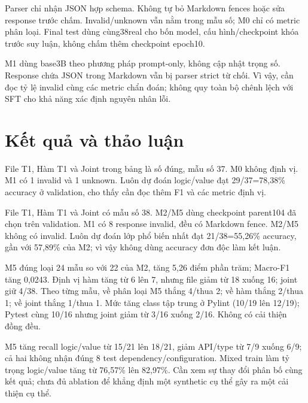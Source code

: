 \documentclass[12pt,a4paper]{article}
\begin{document}
Parser chỉ nhận JSON hợp schema. Không tự bỏ Markdown fences hoặc sửa response trước chấm. Invalid/unknown vẫn nằm trong mẫu số; M0 chỉ có metric phân loại. Final test dùng cùng38real cho bốn model, cấu hình/checkpoint khóa trước suy luận, không chấm thêm checkpoint epoch10.

M1 dùng base3B theo phương pháp prompt-only, không cập nhật trọng số. Response chứa JSON trong Markdown vẫn bị parser strict từ chối. Vì vậy, cần đọc tỷ lệ invalid cùng các metric chẩn đoán; không quy toàn bộ chênh lệch với SFT cho khả năng xác định nguyên nhân lỗi.

\nextpage
\section{Kết quả và thảo luận}
\begin{center}\small\end{center}
File T1, Hàm T1 và Joint trong bảng là số đúng, mẫu số 37. M0 không định vị. M1 có 1 invalid và 1 unknown. Luôn dự đoán logic/value đạt 29/37=78,38\% accuracy ở validation, cho thấy cần đọc thêm F1 và các metric định vị.

\begin{center}\small\end{center}
File T1, Hàm T1 và Joint có mẫu số 38. M2/M5 dùng checkpoint parent104 đã chọn trên validation. M1 có 8 response invalid, đều có Markdown fence. M2/M5 không có invalid. Luôn dự đoán lớp phổ biến nhất đạt 21/38=55,26\% accuracy, gần với 57,89\% của M2; vì vậy không dùng accuracy đơn độc làm kết luận.

M5 đúng loại 24 mẫu so với 22 của M2, tăng 5,26 điểm phần trăm; Macro-F1 tăng 0,0243. Định vị hàm tăng từ 6 lên 7, nhưng file giảm từ 18 xuống 16; joint giữ 4/38. Theo từng mẫu, về phân loại M5 thắng 4/thua 2; về hàm thắng 2/thua 1; về joint thắng 1/thua 1. Mức tăng class tập trung ở Pylint (10/19 lên 12/19); Pytest cùng 10/16 nhưng joint giảm từ 3/16 xuống 2/16. Không có cải thiện đồng đều.

M5 tăng recall logic/value từ 15/21 lên 18/21, giảm API/type từ 7/9 xuống 6/9; cả hai không nhận đúng 8 test dependency/configuration. Mixed train làm tỷ trọng logic/value tăng từ 76,57\% lên 82,97\%. Cần xem sự thay đổi phân bố cùng kết quả; chưa đủ ablation để khẳng định một synthetic cụ thể gây ra một cải thiện cụ thể.
\end{document}
